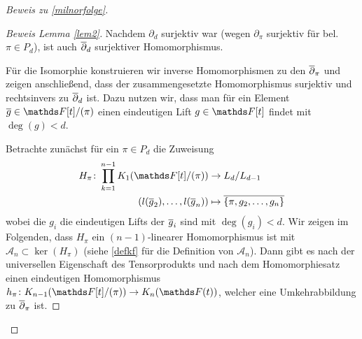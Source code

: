 \documentclass[ngerman,fontsize=11pt, paper=a4, parskip=half, titlepage=true, toc=bib]{scrartcl}
\begin{document}
\begin{proof}[Beweis zu \ref{milnorfolge}]
\begin{proof}[Beweis Lemma \ref{lem2}]
    Nachdem $\partial_d$ surjektiv war (wegen $\partial_\pi$ surjektiv
    für bel. $\pi\in P_d$), ist auch $\overline\partial_d$
    surjektiver Homomorphismus.
    
    Für die Isomorphie konstruieren wir inverse Homomorphismen 
    zu den $\overline\partial_\pi$ und zeigen anschließend, 
    dass der zusammengesetzte Homomorphismus surjektiv und
    rechtsinvers zu $\overline\partial_d$ ist.
    Dazu nutzen wir, dass man für ein Element $\ov g\in\Ftpi$ einen
    eindeutigen Lift $g\in\F[t]$ findet mit $\deg(g)<d$.
    
    Betrachte zunächst für ein $\pi\in P_d$ die Zuweisung
    \begin{align*}
      H_\pi\colon\prod_{k=1}^{n-1} \K_1(\Ftpi) 
      &\to L_d/L_{d-1}\\
      \left( l(\ov g_2),\dotsc, l(\ov g_n) \right)
      &\mapsto \ov{\{\pi,g_2,\dotsc,g_n\}}
    \end{align*}
    wobei die $g_i$ die eindeutigen Lifts der $\overline g_i$ sind mit $\deg(g_i)<d$.
    Wir zeigen im Folgenden, dass $H_\pi$ ein $(n-1)$-linearer
    Homomorphismus ist mit $\mathcal{A}_n\subset \ker(H_\pi)$ (siehe
    \ref{defkf} für die Definition von $\mathcal{A}_n$).
    Dann gibt es nach der universellen Eigenschaft des Tensorprodukts
    und nach dem Homomorphiesatz einen eindeutigen Homomorphismus 
    $h_\pi\colon\K_{n-1}(\Ftpi)\to\KnFt$,
    welcher eine Umkehrabbildung zu $\overline\partial_\pi$ ist.
    


\end{proof}
\end{proof}
\end{document}
